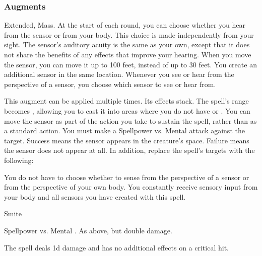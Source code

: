 \subsubsection{Augments}
 Extended, Mass.
At the start of each round, you can choose whether you hear from the sensor or from your body.
This choice is made independently from your sight.
The sensor's auditory acuity is the same as your own, except that it does not share the benefits of any  effects that improve your hearing.
When you move the sensor, you can move it up to 100 feet, instead of up to 30 feet.
You create an additional sensor in the same location.
Whenever you see or hear from the perspective of a sensor, you choose which sensor to see or hear from.
\par
This augment can be applied multiple times.
Its effects stack.
The spell's range becomes \rngunrestricted, allowing you to cast it into areas where you do not have  or .
You can move the sensor as part of the action you take to sustain the spell, rather than as a standard action.
You must make a Spellpower vs. Mental attack against the target.
Success means the sensor appears in the creature's space.
Failure means the sensor does not appear at all.
In addition, replace
the spell's targets with the following:
\begin{augmenttargetinginfo}
\end{augmenttargetinginfo}
You do not have to choose whether to sense from the perspective of a sensor or from the perspective of your own body.
You constantly receive sensory input from your body and all sensors you have created with this spell.
\begin{spellsection}{Smite}
\begin{spellheader}
\end{spellheader}
\begin{spellcontent}
\begin{spelltargetinginfo}
\end{spelltargetinginfo}
\begin{spelleffects}
\begin{spellattack}{Spellpower vs. Mental}
\spellsuccess {}.
\spellcritical As above, but double damage.
\end{spellattack}
\end{spelleffects}
\end{spellcontent}
\begin{spellfooter}
\miscastexplode
\end{spellfooter}
\begin{spellcantrip}
The spell deals \minus1d damage and has no additional effects on a critical hit.
\end{spellcantrip}
\end{spellsection}
